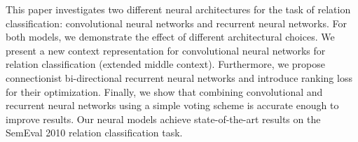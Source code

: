 This paper investigates two different neural architectures for the task of relation classification: convolutional neural networks and recurrent neural networks. For both models, we demonstrate the effect of different architectural choices. We present a new context representation for convolutional neural networks for relation classification (extended middle context). Furthermore, we propose connectionist bi-directional recurrent neural networks and introduce ranking loss for their optimization. Finally, we show that combining convolutional and recurrent neural networks using a simple voting scheme is accurate enough to improve results. Our neural models achieve state-of-the-art results on the SemEval 2010 relation classification task.
